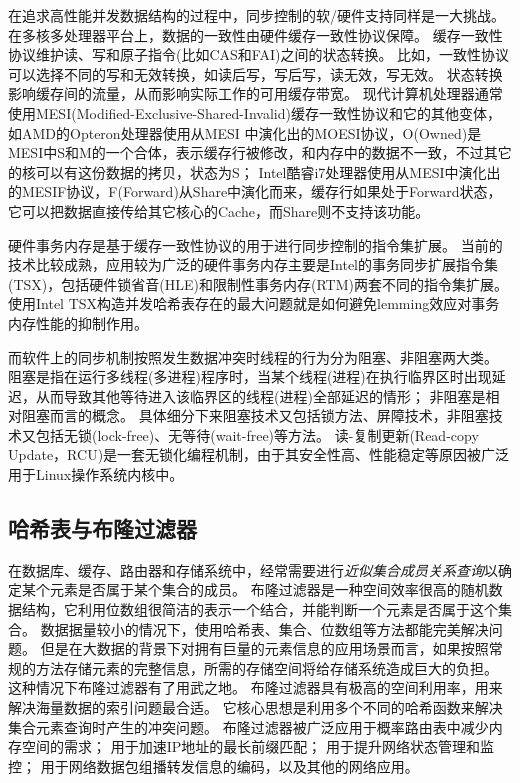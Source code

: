 在追求高性能并发数据结构的过程中，同步控制的软/硬件支持同样是一大挑战。
在多核多处理器平台上，数据的一致性由硬件缓存一致性协议保障。
缓存一致性协议维护读、写和原子指令(比如CAS和FAI)之间的状态转换。
比如，一致性协议可以选择不同的写和无效转换，如读后写，写后写，读无效，写无效。
状态转换影响缓存间的流量，从而影响实际工作的可用缓存带宽。
现代计算机处理器通常使用MESI(Modified-Exclusive-Shared-Invalid)缓存一致性协议和它的其他变体，如AMD的Opteron处理器使用从MESI 中演化出的MOESI协议，O(Owned)是MESI中S和M的一个合体，表示缓存行被修改，和内存中的数据不一致，不过其它的核可以有这份数据的拷贝，状态为S；
Intel酷睿i7处理器使用从MESI中演化出的MESIF协议，F(Forward)从Share中演化而来，缓存行如果处于Forward状态，它可以把数据直接传给其它核心的Cache，而Share则不支持该功能。

硬件事务内存是基于缓存一致性协议的用于进行同步控制的指令集扩展。
当前的技术比较成熟，应用较为广泛的硬件事务内存主要是Intel的事务同步扩展指令集(TSX)\cite{}，包括硬件锁省音(HLE)和限制性事务内存(RTM)两套不同的指令集扩展。
使用Intel TSX构造并发哈希表存在的最大问题就是如何避免lemming效应对事务内存性能的抑制作用。

而软件上的同步机制按照发生数据冲突时线程的行为分为阻塞、非阻塞两大类。
阻塞是指在运行多线程(多进程)程序时，当某个线程(进程)在执行临界区时出现延迟，从而导致其他等待进入该临界区的线程(进程)全部延迟的情形；
非阻塞是相对阻塞而言的概念。
具体细分下来阻塞技术又包括锁方法、屏障技术，非阻塞技术又包括无锁(lock-free)、无等待(wait-free)等方法。
读-复制更新(Read-copy Update，RCU)是一套无锁化编程机制，由于其安全性高、性能稳定等原因被广泛用于Linux操作系统内核中\cite{mckenney2003kernel,mckenney2004scaling,mckenney2013rcu}。

\subsection{哈希表与布隆过滤器}

在数据库、缓存、路由器和存储系统中，经常需要进行\textit{近似集合成员关系查询}以确定某个元素是否属于某个集合的成员。
布隆过滤器是一种空间效率很高的随机数据结构，它利用位数组很简洁的表示一个结合，并能判断一个元素是否属于这个集合。
数据据量较小的情况下，使用哈希表、集合、位数组等方法都能完美解决问题。
但是在大数据的背景下对拥有巨量的元素信息的应用场景而言，如果按照常规的方法存储元素的完整信息，所需的存储空间将给存储系统造成巨大的负担。
这种情况下布隆过滤器有了用武之地。
布隆过滤器具有极高的空间利用率，用来解决海量数据的索引问题最合适。
它核心思想是利用多个不同的哈希函数来解决集合元素查询时产生的冲突问题。
布隆过滤器被广泛应用于概率路由表中减少内存空间的需求\cite{yu2009buffalo}；
用于加速IP地址的最长前缀匹配\cite{dharmapurikar2003longest}；
用于提升网络状态管理和监控\cite{bonomi2006beyond,song2005fast}；
用于网络数据包组播转发信息的编码\cite{jokela2009lipsin}，以及其他的网络应用\cite{broder2004network}。


